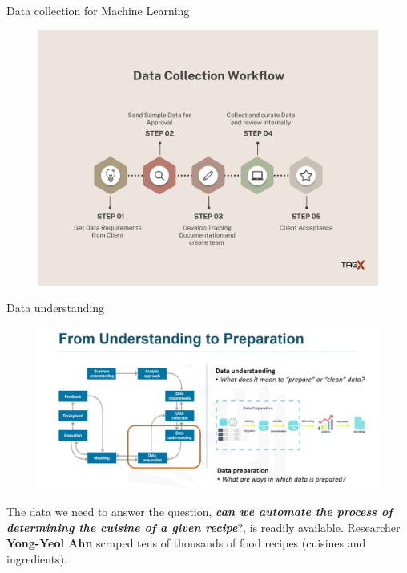 \documentclass{beamer}
\begin{document}
\begin{frame}{Data collection for Machine Learning}
	\begin{figure}
		\includegraphics[width=\textwidth]{data collection.png}
	\end{figure}
\end{frame}


\begin{frame}{Data understanding}
	\begin{figure}
		\includegraphics[width=\textwidth]{data understanding .png}
	\end{figure}
	The data we need to answer the question, \textbf{\textit{can we automate the process of determining the cuisine of a given recipe}}?, is readily available. Researcher \textbf{Yong-Yeol Ahn} scraped tens of thousands of food recipes (cuisines and ingredients).
\end{frame}
\end{document}
